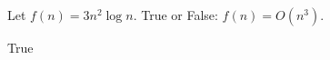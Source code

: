 \begin{prob}
    Let $f(n) = 3n^2 \log n$. True or False: $f(n) = O(n^3)$.

    \Tf{}

    \begin{soln}
        True
    \end{soln}
\end{prob}

